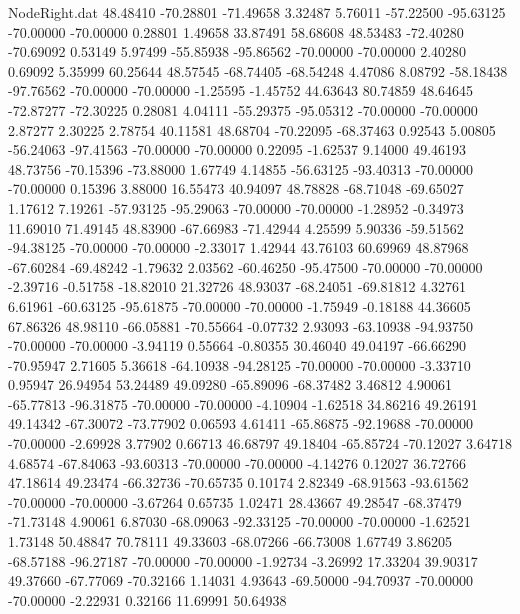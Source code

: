\begin{filecontents}{NodeRight.dat}
  48.48410  -70.28801  -71.49658     3.32487    5.76011  -57.22500  -95.63125  -70.00000  -70.00000    0.28801    1.49658   33.87491   58.68608
  48.53483  -72.40280  -70.69092     0.53149    5.97499  -55.85938  -95.86562  -70.00000  -70.00000    2.40280    0.69092    5.35999   60.25644
  48.57545  -68.74405  -68.54248     4.47086    8.08792  -58.18438  -97.76562  -70.00000  -70.00000   -1.25595   -1.45752   44.63643   80.74859
  48.64645  -72.87277  -72.30225     0.28081    4.04111  -55.29375  -95.05312  -70.00000  -70.00000    2.87277    2.30225    2.78754   40.11581
  48.68704  -70.22095  -68.37463     0.92543    5.00805  -56.24063  -97.41563  -70.00000  -70.00000    0.22095   -1.62537    9.14000   49.46193
  48.73756  -70.15396  -73.88000     1.67749    4.14855  -56.63125  -93.40313  -70.00000  -70.00000    0.15396    3.88000   16.55473   40.94097
  48.78828  -68.71048  -69.65027     1.17612    7.19261  -57.93125  -95.29063  -70.00000  -70.00000   -1.28952   -0.34973   11.69010   71.49145
  48.83900  -67.66983  -71.42944     4.25599    5.90336  -59.51562  -94.38125  -70.00000  -70.00000   -2.33017    1.42944   43.76103   60.69969
  48.87968  -67.60284  -69.48242    -1.79632    2.03562  -60.46250  -95.47500  -70.00000  -70.00000   -2.39716   -0.51758  -18.82010   21.32726
  48.93037  -68.24051  -69.81812     4.32761    6.61961  -60.63125  -95.61875  -70.00000  -70.00000   -1.75949   -0.18188   44.36605   67.86326
  48.98110  -66.05881  -70.55664    -0.07732    2.93093  -63.10938  -94.93750  -70.00000  -70.00000   -3.94119    0.55664   -0.80355   30.46040
  49.04197  -66.66290  -70.95947     2.71605    5.36618  -64.10938  -94.28125  -70.00000  -70.00000   -3.33710    0.95947   26.94954   53.24489
  49.09280  -65.89096  -68.37482     3.46812    4.90061  -65.77813  -96.31875  -70.00000  -70.00000   -4.10904   -1.62518   34.86216   49.26191
  49.14342  -67.30072  -73.77902     0.06593    4.61411  -65.86875  -92.19688  -70.00000  -70.00000   -2.69928    3.77902    0.66713   46.68797
  49.18404  -65.85724  -70.12027     3.64718    4.68574  -67.84063  -93.60313  -70.00000  -70.00000   -4.14276    0.12027   36.72766   47.18614
  49.23474  -66.32736  -70.65735     0.10174    2.82349  -68.91563  -93.61562  -70.00000  -70.00000   -3.67264    0.65735    1.02471   28.43667
  49.28547  -68.37479  -71.73148     4.90061    6.87030  -68.09063  -92.33125  -70.00000  -70.00000   -1.62521    1.73148   50.48847   70.78111
  49.33603  -68.07266  -66.73008     1.67749    3.86205  -68.57188  -96.27187  -70.00000  -70.00000   -1.92734   -3.26992   17.33204   39.90317
  49.37660  -67.77069  -70.32166     1.14031    4.93643  -69.50000  -94.70937  -70.00000  -70.00000   -2.22931    0.32166   11.69991   50.64938

\end{filecontents}

